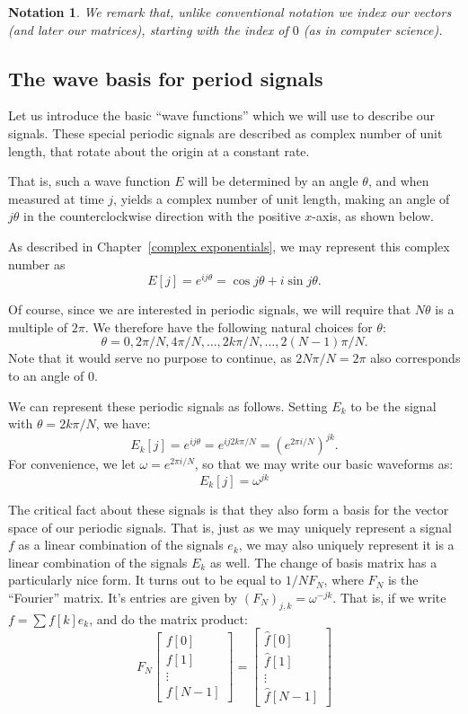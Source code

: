 \documentclass[12pt]{report}
\theoremstyle{plain}
\newtheorem{notn}[thm]{Notation}
\begin{document}
\begin{notn}
We remark that, unlike conventional notation we index our vectors (and later our matrices), starting with the index of $0$ (as in computer science).
\end{notn}

\subsection{The wave basis for period signals}

Let us introduce the basic ``wave functions'' which we will use to describe our signals. These special periodic signals are described as complex number of unit length, that rotate about the origin at a constant rate.

That is, such a wave function $E$ will be determined by an angle $\theta$, and when measured at time $j$, yields a complex number of unit length, making an angle of $j\theta$ in the counterclockwise direction with the positive $x$-axis, as shown below.

As described in Chapter~\ref{complex exponentials}, we may represent this complex number as 
\[E[j] = e^{ij\theta} = \cos{j\theta} + i \sin{j \theta}.\]

Of course, since we are interested in periodic signals, we will require that $N\theta$ is a multiple of $2\pi$. We therefore have the following natural choices for $\theta$:
\[\theta = 0, 2 \pi/N, 4 \pi / N, \ldots, 2k\pi/N, \ldots, 2(N-1)\pi/N.\]
Note that it would serve no purpose to continue, as $2N\pi/N = 2\pi$ also corresponds to an angle of $0$.

We can represent these periodic signals as follows. Setting $E_k$ to be the signal with $\theta= 2k\pi/N$, we have:
\[E_k[j] = e^{ij\theta} = e^{ij2k\pi/N} = \left(e^{2\pi i / N}\right)^{jk}. \]
For convenience, we let $\omega = e^{2 \pi i / N}$, so that we may write our basic waveforms as:
\[E_k[j] = \omega^{jk} \]

The critical fact about these signals is that they also form a basis for the vector space of our periodic signals. That is, just as we may uniquely represent a signal $f$ as a linear combination of the signals $e_k$, we may also uniquely represent it is a linear combination of the signals $E_k$ as well. The change of basis matrix has a particularly nice form. It turns out to be equal to $1/N F_N$, where $F_N$ is the ``Fourier'' matrix. It's entries are given by $(F_N)_{j,k} = \omega^{-jk}$. That is, if we write $f = \sum f[k] e_k$, and do the matrix product:
\[
F_N 
\left[
\begin{matrix}
	f[0] \\
	f[1] \\
	\vdots \\
	f[N-1]
\end{matrix}
\right]
=
\left[
\begin{matrix}
	\hat f[0] \\
	\hat f[1] \\
	\vdots \\
	\hat f[N-1]
\end{matrix}
\right]
\]
\end{document}
